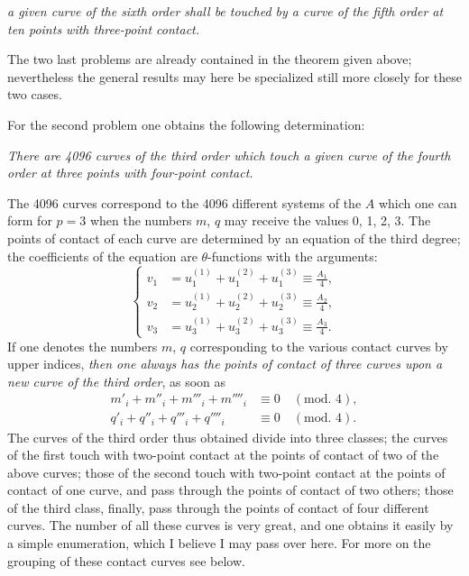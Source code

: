 \documentclass{article}
\begin{document}
\emph{a given curve of the sixth order shall be touched by a curve of the fifth order at ten points with three-point contact.}

The two last problems are already contained in the theorem given above; nevertheless the general results may here be specialized still more closely for these two cases.

For the second problem one obtains the following determination:

\emph{There are 4096 curves of the third order which touch a given curve of the fourth order at three points with four-point contact.}

The 4096 curves correspond to the 4096 different systems of the $A$ which one can form for $p = 3$ when the numbers $m$, $q$ may receive the values 0, 1, 2, 3. The points of contact of each curve are determined by an equation of the third degree; the coefficients of the equation are $\theta$-functions with the arguments:
\[
\left\{
\begin{aligned}
v_{1} &= u_{1}^{(1)} + u_{1}^{(2)} + u_{1}^{(3)} \equiv \frac{A_{1}}{4}, \\
v_{2} &= u_{2}^{(1)} + u_{2}^{(2)} + u_{2}^{(3)} \equiv \frac{A_{2}}{4}, \\
v_{3} &= u_{3}^{(1)} + u_{3}^{(2)} + u_{3}^{(3)} \equiv \frac{A_{3}}{4}.
\end{aligned}
\right.
\tag{10.}
\]
If one denotes the numbers $m$, $q$ corresponding to the various contact curves by upper indices, \emph{then one always has the points of contact of three curves upon a new curve of the third order}, as soon as
\[
\begin{aligned}
m'_{i} + m''_{i} + m'''_{i} + m''''_{i} &\equiv 0 \quad (\text{mod. } 4), \\
q'_{i} + q''_{i} + q'''_{i} + q''''_{i} &\equiv 0 \quad (\text{mod. } 4).
\end{aligned}
\]
The curves of the third order thus obtained divide into three classes; the curves of the first touch with two-point contact at the points of contact of two of the above curves; those of the second touch with two-point contact at the points of contact of one curve, and pass through the points of contact of two others; those of the third class, finally, pass through the points of contact of four different curves. The number of all these curves is very great, and one obtains it easily by a simple enumeration, which I believe I may pass over here. For more on the grouping of these contact curves see below.
\end{document}
